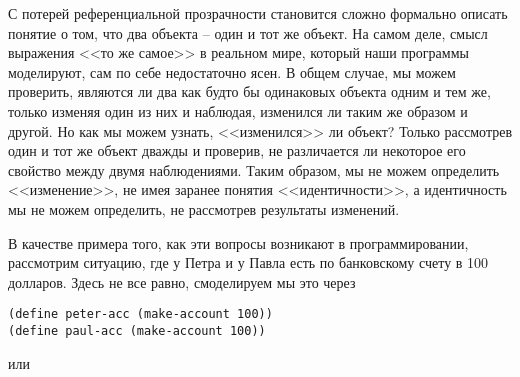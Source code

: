 С потерей референциальной прозрачности
становится сложно формально описать понятие о том, что два объекта --
один и тот же объект.  На самом деле, смысл выражения <<то же самое>> в
реальном мире, который наши программы моделируют, сам по себе
недостаточно ясен.  В общем случае, мы можем проверить, являются ли
два как будто бы одинаковых объекта одним и тем же, только изменяя один из них
и наблюдая, изменился ли таким же образом и другой.  Но как мы можем
узнать, <<изменился>> ли объект? Только рассмотрев один и тот
же объект дважды и проверив, не различается ли некоторое его свойство между
двумя наблюдениями.  Таким образом, мы не можем определить <<изменение>>, не имея
заранее понятия <<идентичности>>, а идентичность мы не можем
определить, не рассмотрев результаты изменений.

В качестве примера того, как эти вопросы возникают в
программировании, рассмотрим ситуацию, где у Петра и у Павла есть по
банковскому счету в 100 долларов.  Здесь не все равно, смоделируем мы это
через

\begin{Verbatim}[fontsize=\small]
(define peter-acc (make-account 100))
(define paul-acc (make-account 100))
\end{Verbatim}
или

